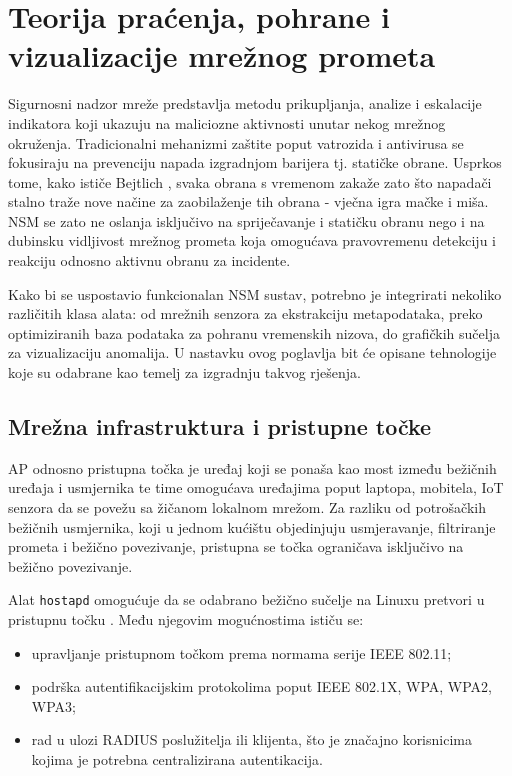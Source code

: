 \chapter{Teorija praćenja, pohrane i \mbox{vizualizacije} mrežnog prometa}

Sigurnosni nadzor mreže  predstavlja metodu prikupljanja, analize i eskalacije indikatora koji ukazuju na maliciozne aktivnosti unutar nekog mrežnog okruženja. 
Tradicionalni mehanizmi zaštite poput vatrozida i antivirusa se fokusiraju na prevenciju napada izgradnjom barijera tj. statičke obrane. Usprkos tome, kako ističe 
Bejtlich \cite{bejtlich_nsm}, svaka obrana s vremenom zakaže zato što napadači stalno traže nove načine za zaobilaženje tih obrana - vječna igra mačke i miša.
NSM se zato ne oslanja isključivo na spriječavanje i statičku obranu nego i na dubinsku vidljivost mrežnog prometa koja omogućava pravovremenu detekciju i reakciju odnosno aktivnu obranu za incidente.

Kako bi se uspostavio funkcionalan NSM sustav, potrebno je integrirati nekoliko različitih klasa alata: od mrežnih senzora za ekstrakciju metapodataka, preko optimiziranih baza podataka za 
pohranu vremenskih nizova, do grafičkih sučelja za vizualizaciju anomalija. 
U nastavku ovog poglavlja bit će opisane tehnologije koje su odabrane kao temelj za izgradnju takvog rješenja.

\section{Mrežna infrastruktura i pristupne točke}

AP  odnosno pristupna točka je uređaj koji se ponaša kao most  između bežičnih uređaja i usmjernika te time omogućava uređajima poput laptopa, mobitela, IoT senzora 
da se povežu sa žičanom lokalnom mrežom. Za razliku od potrošačkih bežičnih usmjernika, koji u jednom kućištu objedinjuju usmjeravanje, filtriranje prometa i bežično povezivanje, pristupna se točka ograničava 
isključivo na bežično povezivanje.

Alat \texttt{hostapd} omogućuje da se odabrano bežično sučelje na Linuxu pretvori u pristupnu točku \cite{hostapd_docs}. Među njegovim mogućnostima ističu se:
\begin{itemize}
    \item upravljanje pristupnom točkom prema normama serije IEEE 802.11;
    \item podrška autentifikacijskim protokolima poput IEEE 802.1X, WPA, WPA2, WPA3;
    \item rad u ulozi RADIUS poslužitelja ili klijenta, što je značajno korisnicima kojima je potrebna centralizirana autentikacija.
\end{itemize}

